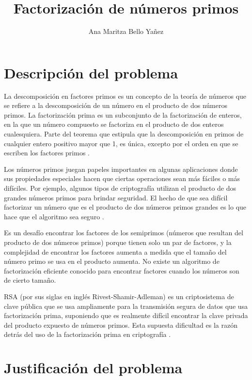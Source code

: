 \documentclass{article}
\begin{document}
\title{Factorización de números primos}
\author{Ana Maritza Bello Yañez}
\maketitle


\section{Descripción del problema}

La descomposición en factores primos es un concepto de la teoría de números que
se refiere a la descomposición de un número en el producto de dos números
primos. La factorización prima es un subconjunto de la factorización de enteros,
en la que un número compuesto se factoriza en el producto de dos enteros
cualesquiera. Parte del teorema que estipula que la descomposición en primos de
cualquier entero positivo mayor que 1, es única, excepto por el orden en que se
escriben los factores primos \cite{lewinter2015elementary}.

Los números primos juegan papeles importantes en algunas aplicaciones donde sus
propiedades especiales hacen que ciertas operaciones sean más fáciles o más
difíciles. Por ejemplo, algunos tipos de criptografía utilizan el producto de
dos grandes números primos para brindar seguridad. El hecho de que sea difícil
factorizar un número que es el producto de dos números primos grandes es lo que
hace que el algoritmo sea seguro \cite{stephens2019essential}.

Es un desafío encontrar los factores de los semiprimos (números que resultan del
producto de dos números primos) porque tienen solo un par de factores, y la
complejidad de encontrar los factores aumenta a medida que el tamaño del número
primo se usa en el producto aumenta. No existe un algoritmo de factorización
eficiente conocido para encontrar factores cuando los números son de cierto
tamaño. 

RSA (por sus siglas en inglés Rivest-Shamir-Adleman) es un criptosistema de
clave pública que se usa ampliamente para la transmisión segura de datos que usa
factorización prima, suponiendo que es realmente difícil encontrar la clave
privada del producto expuesto de números primos. Esta supuesta dificultad es la
razón detrás del uso de la factorización prima en criptografía
\cite{raj2019foundations}.


\section{Justificación del problema}
\end{document}
